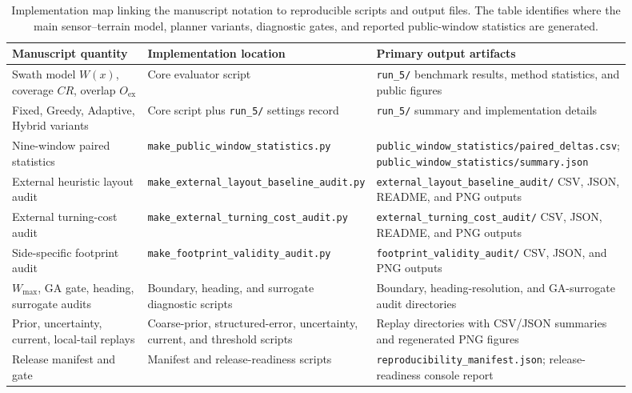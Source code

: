 \documentclass[jmse,article,submit,moreauthors]{Definitions/mdpi}
\begin{document}
\begin{table}[!htbp]
	\centering
	\caption{Implementation map linking the manuscript notation to reproducible scripts and output files. The table identifies where the main sensor--terrain model, planner variants, diagnostic gates, and reported public-window statistics are generated.}
	\label{tab:implementation_map}
	\tiny
	\renewcommand{\arraystretch}{1.10}
	\setlength{\tabcolsep}{2.0pt}
	\begin{tabular}{@{}p{0.24\linewidth}p{0.32\linewidth}p{0.34\linewidth}@{}}
		\toprule[1bp]
		\textbf{Manuscript quantity} & \textbf{Implementation location} & \textbf{Primary output artifacts} \\
		\midrule[1bp]
		Swath model \(W(x)\), coverage \(CR\), overlap \(O_{\mathrm{ex}}\) & Core evaluator script & \texttt{run\_5/} benchmark results, method statistics, and public figures \\
		Fixed, Greedy, Adaptive, Hybrid variants & Core script plus \texttt{run\_5/} settings record & \texttt{run\_5/} summary and implementation details \\
		Nine-window paired statistics & \texttt{make\_public\_window\_statistics.py} & \texttt{public\_window\_statistics/paired\_deltas.csv}; \texttt{public\_window\_statistics/summary.json} \\
		External heuristic layout audit & \texttt{make\_external\_layout\_baseline\_audit.py} & \texttt{external\_layout\_baseline\_audit/} CSV, JSON, README, and PNG outputs \\
		External turning-cost audit & \texttt{make\_external\_turning\_cost\_audit.py} & \texttt{external\_turning\_cost\_audit/} CSV, JSON, README, and PNG outputs \\
		Side-specific footprint audit & \texttt{make\_footprint\_validity\_audit.py} & \texttt{footprint\_validity\_audit/} CSV, JSON, and PNG outputs \\
		\(W_{\max}\), GA gate, heading, surrogate audits & Boundary, heading, and surrogate diagnostic scripts & Boundary, heading-resolution, and GA-surrogate audit directories \\
		Prior, uncertainty, current, local-tail replays & Coarse-prior, structured-error, uncertainty, current, and threshold scripts & Replay directories with CSV/JSON summaries and regenerated PNG figures \\
		Release manifest and gate & Manifest and release-readiness scripts & \texttt{reproducibility\_manifest.json}; release-readiness console report \\
		\bottomrule[1bp]
	\end{tabular}
\end{table}
\end{document}
